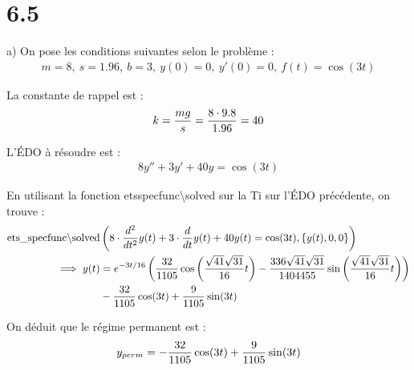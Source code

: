 \section*{6.5}

a) On pose les conditions suivantes selon le problème :
\begin{align*}
    m = 8,\ s = 1.96,\ b = 3,\ y(0)=0,\ y'(0)=0,\ f(t) = \cos(3t)
\end{align*}

La constante de rappel est :
\begin{align*}
    k = \dfrac{mg}{s} = \dfrac{8\cdot 9.8}{1.96} = 40
\end{align*}

L'ÉDO à résoudre est :
\begin{align*}
    8y'' +3y'+40y=\cos(3t)
\end{align*}

En utilisant la fonction ets\textunderscore specfunc\textbackslash solved sur la Ti
sur l'ÉDO précédente, on trouve :
\begin{align*}
    \operatorname{ets\_ specfunc\backslash solved} & \left({8\cdot\dfrac{d ^2}{d t^2}y(t) + 3\cdot\dfrac{d }{d t}y(t) + 40y(t)=\cos(3t),
    \{y(t),0,0\}}\right) \\
    \implies y(t) &=  e^{-3t/16}\left({\dfrac{32}{1105}\cos\left({\dfrac{\sqrt{41}\sqrt{31}}{16}t}\right)
    -\dfrac{336\sqrt{41}\sqrt{31}}{1404455}\sin\left({\dfrac{\sqrt{41}\sqrt{31}}{16}t}\right)}\right)\\
    &-\dfrac{32}{1105}\cos(3t) + \dfrac{9}{1105}\sin(3t)
\end{align*}

On déduit que le régime permanent est :
\begin{align*}
    y_{perm} = -\dfrac{32}{1105}\cos(3t) + \dfrac{9}{1105}\sin(3t)
\end{align*}
